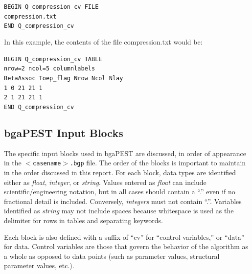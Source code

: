 \documentclass[11pt,oneside,onecolumn]{usgsreport}
\begin{document}
\begin{appendix}
\begin{bibunit}
\texttt{BEGIN Q\_compression\_cv FILE }~\\
\texttt{compression.txt}~\\
\texttt{END Q\_compression\_cv}

In this example, the contents of the file compression.txt would be:

\texttt{BEGIN Q\_compression\_cv TABLE }~\\
\texttt{nrow=2 ncol=5 columnlabels }~\\
\texttt{BetaAssoc Toep\_flag Nrow Ncol Nlay }~\\
\texttt{1 0 21 21 1 }~\\
\texttt{2 1 21 21 1 }~\\
\texttt{END Q\_compression\_cv}


\subsection{bgaPEST Input Blocks}

The specific input blocks used in bgaPEST are discussed, in order
of appearance in the \texttt{$<$casename$>$.bgp} file. The order of the
blocks is important to maintain in the order discussed in this report.
For each block, data types are identified either as \emph{float},
\emph{integer}, or \emph{string}. Values entered as \emph{float} can
include scientific/engineering notation, but in all cases should contain
a ``.'' even if no fractional detail is included. Conversely, \emph{integers}
must not contain ``.''. Variables identified as \emph{string} may
not include spaces because whitespace is used as the delimiter for
rows in tables and separating keywords.

Each block is also defined with a suffix of ``cv'' for ``control
variables,'' or ``data'' for data. Control variables are those
that govern the behavior of the algorithm as a whole as opposed to
data points (such as parameter values, structural parameter values,
etc.). 




\end{bibunit}
\end{appendix}
\end{document}
